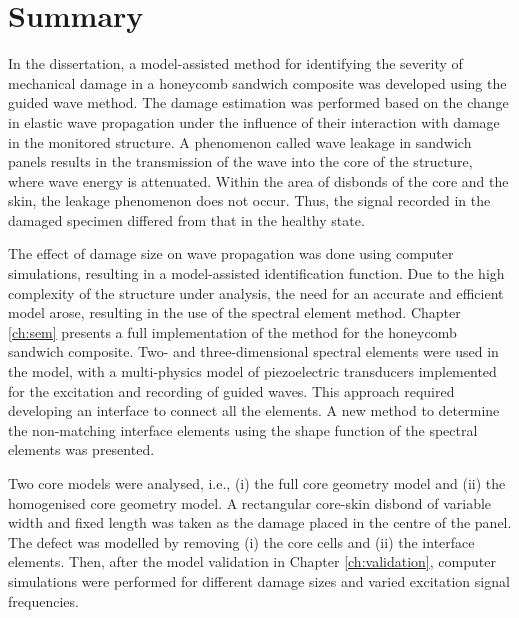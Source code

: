 
\chapter[Summary]{Summary}
\label{ch:summary}

In the dissertation, a model-assisted method for identifying the severity of mechanical damage in a honeycomb sandwich composite was developed using the guided wave method.
The damage estimation was performed based on the change in elastic wave propagation under the influence of their interaction with damage in the monitored structure.
A phenomenon called wave leakage in sandwich panels results in the transmission of the wave into the core of the structure, where wave energy is attenuated.
Within the area of disbonds of the core and the skin, the leakage phenomenon does not occur.
Thus, the signal recorded in the damaged specimen differed from that in the healthy state.

The effect of damage size on wave propagation was done using computer simulations, resulting in a model-assisted identification function.
Due to the high complexity of the structure under analysis, the need for an accurate and efficient model arose, resulting in the use of the spectral element method.
Chapter \ref{ch:sem} presents a full implementation of the method for the honeycomb sandwich composite.
Two- and three-dimensional spectral elements were used in the model, with a multi-physics model of piezoelectric transducers implemented for the excitation and recording of guided waves.
This approach required developing an interface to connect all the elements.
A new method to determine the non-matching interface elements using the shape function of the spectral elements was presented.

Two core models were analysed, i.e., (i) the full core geometry model and (ii) the homogenised core geometry model.
A rectangular core-skin disbond of variable width and fixed length was taken as the damage placed in the centre of the panel.
The defect was modelled by removing (i) the core cells and (ii) the interface elements.
Then, after the model validation in Chapter \ref{ch:validation}, computer simulations were performed for different damage sizes and varied excitation signal frequencies.

